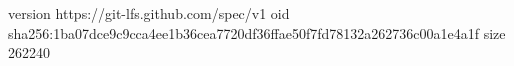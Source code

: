 version https://git-lfs.github.com/spec/v1
oid sha256:1ba07dce9c9cca4ee1b36cea7720df36ffae50f7fd78132a262736c00a1e4a1f
size 262240
